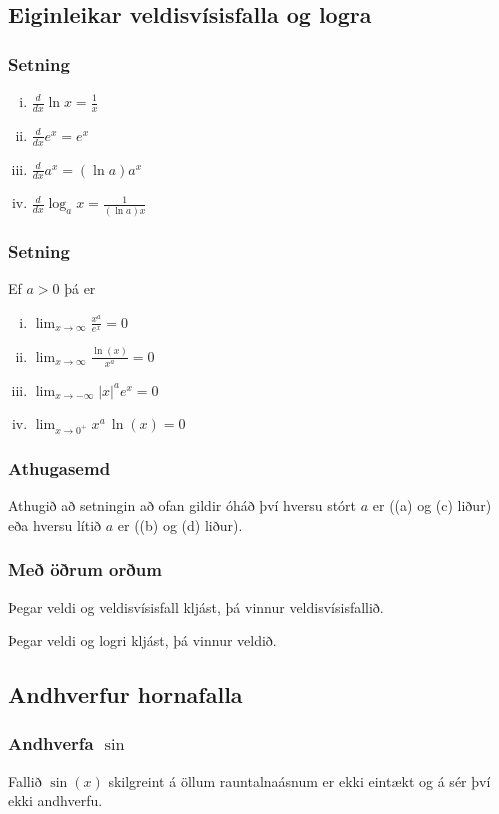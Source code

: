 \documentclass[icelandic,a4paper,12pt]{article}
\begin{document}
\subsection{Eiginleikar veldisvísisfalla og logra}
\subsubsection{Setning}
\begin{enumerate}[(i)]
\item  $\frac{d}{dx}\ln x=\frac 1x$\pause
\item  $\frac{d}{dx}e^x=e^x$\pause
\item  $\frac{d}{dx}a^x=(\ln a)a^x$\pause
\item  $\frac{d}{dx}\log_a x=\frac{1}{(\ln a)x}$
\end{enumerate}

\subsubsection{Setning}
Ef $a>0$ þá er 
\begin{enumerate}[(i)]
\item $\lim_{x\to \infty} \frac{x^a}{e^x} = 0$
\item $\lim_{x\to \infty} \frac{\ln(x)}{x^a} = 0$
\item $\lim_{x\to -\infty} |x|^a e^x = 0$
\item $\lim_{x\to 0^+} x^a\, \ln(x) = 0$
\end{enumerate}		

\subsubsection{Athugasemd}
Athugið að setningin að ofan gildir óháð því hversu
stórt $a$ er ((a) og (c) liður) eða hversu lítið
$a$ er ((b) og (d) liður).

\subsubsection{Með öðrum orðum}
Þegar veldi og veldisvísisfall kljást, þá vinnur veldisvísisfallið.

Þegar veldi og logri kljást, þá vinnur veldið.

\subsection{Andhverfur hornafalla}

\subsubsection{Andhverfa $\sin$}
Fallið $\sin(x)$ skilgreint á öllum rauntalnaásnum er ekki 
eintækt og á sér því ekki andhverfu. 
\end{document}
